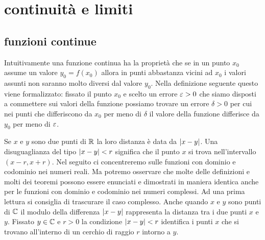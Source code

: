 \chapter{continuità e limiti}
\label{ch:successioni}

\section{funzioni continue}
\label{sec:continuita}

Intuitivamente una funzione continua ha la proprietà
che se in un punto $x_0$ assume un valore $y_0=f(x_0)$ allora
in punti abbastanza vicini ad $x_0$ i valori assunti
non saranno molto diversi dal valore $y_0$.
Nella definizione seguente questo viene formalizzato:
fissato il punto $x_0$ e scelto un errore $\varepsilon>0$
che siamo disposti a commettere sui valori della funzione
possiamo trovare un errore $\delta>0$ per cui nei punti
che differiscono da $x_0$ per meno di $\delta$ il valore
della funzione differisce da $y_0$ per meno di $\varepsilon$.

Se $x$ e $y$ sono due punti di ${\mathbb R}$ la loro distanza 
è data da ${\left|x-y\right|}$. 
Una disuguaglianza del tipo ${\left|x-y\right|}<r$ significa 
che il punto $x$ si trova nell'intervallo $(x-r,x+r)$.
Nel seguito ci concentreremo sulle funzioni con dominio 
e codominio nei numeri reali. 
Ma potremo osservare che molte delle definizioni e molti 
dei teoremi possono essere enunciati e dimostrati in maniera 
identica anche per le funzioni con dominio e codominio 
nei numeri complessi. 
Ad una prima lettura si consiglia di trascurare 
il caso complesso.
%
%
Anche quando $x$ e $y$ sono punti di ${\mathbb C}$ il modulo della 
differenza ${\left|x-y\right|}$ rappresenta la distanza tra i due 
punti $x$ e $y$. 
Fissato $y\in {\mathbb C}$ e $r>0$
la condizione ${\left|x-y\right|}<r$ identifica i punti $x$ 
che si trovano all'interno di un cerchio di raggio $r$
intorno a $y$.

